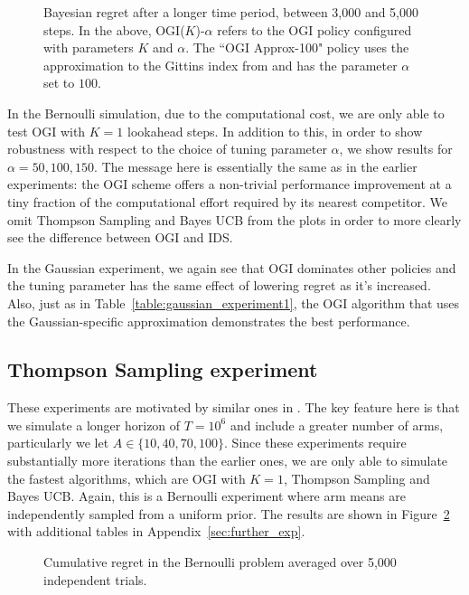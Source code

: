 \begin{figure}[h!]
	
	\caption{Bayesian regret after a longer time period, between 3,000 and 5,000 steps. In the above, OGI($K$)-$\alpha$ refers to the OGI policy configured with parameters $K$ and $\alpha$. The ``OGI Approx-100" policy uses the approximation to the Gittins index from \cite{powell2012optimal} and has the parameter $\alpha$ set to $100$.}
	\label{fig:bayesian_regret}
\end{figure}

In the Bernoulli simulation, due to the computational cost, we are only able to test OGI with $K = 1$ lookahead steps. In addition to this, in order to show robustness with respect to the choice of tuning parameter $\alpha$, we show results for $\alpha = 50,100,150$. The message here is essentially the same as in the earlier experiments: the OGI scheme offers a non-trivial performance improvement at a tiny fraction of the computational effort required by its nearest competitor. We omit Thompson Sampling and Bayes UCB from the plots in order to more clearly see the difference between OGI and IDS.

In the Gaussian experiment, we again see that OGI dominates other policies and the tuning parameter has the same effect of lowering regret as it's increased. Also, just as in Table~\ref{table:gaussian_experiment1}, the OGI algorithm that uses the Gaussian-specific approximation demonstrates the best performance.

\subsection{Thompson Sampling experiment} \label{exp:ts_sampling_experiment}
These experiments are motivated by similar ones in \cite{chapelle2011empirical}. The key feature here is that we simulate a longer horizon of $T = 10^6$ and include a greater number of arms, particularly we let $A \in \{10,40,70,100\}$. Since these experiments require substantially more iterations than the earlier ones, we are only able to simulate the fastest algorithms, which are OGI with $K=1$, Thompson Sampling and Bayes UCB. Again, this is a Bernoulli experiment where arm means are independently sampled from a uniform prior. The results are shown in Figure~\ref{fig:chapelle_and_li} with additional tables in Appendix~\ref{sec:further_exp}.
\begin{figure}
	\centering
	
	\caption{Cumulative regret in the Bernoulli problem averaged over 5,000 independent trials.}
	\label{fig:chapelle_and_li}
\end{figure}

